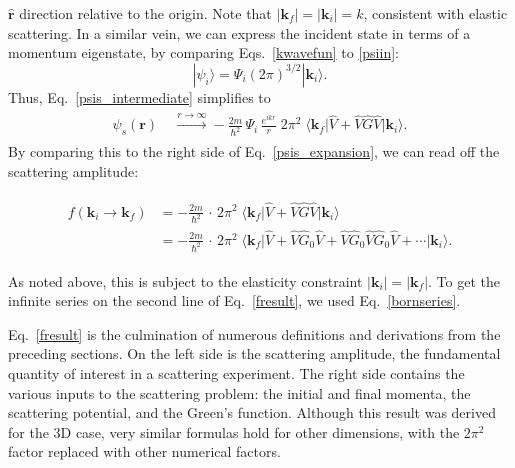 \documentclass[pra,12pt]{revtex4-2}
\begin{document}
$\hat{\mathbf{r}}$ direction relative to the origin.  Note that
$|\mathbf{k}_f| = |\mathbf{k}_i| = k$, consistent with elastic
scattering.  In a similar vein, we can express the incident state in
terms of a momentum eigenstate, by comparing Eqs.~\eqref{kwavefun} to
\eqref{psiin}:
\begin{equation}
  |\psi_i\rangle = \Psi_i (2\pi)^{3/2} |\mathbf{k}_i\rangle.  
\end{equation}
Thus, Eq.~\eqref{psis_intermediate} simplifies to
\begin{align}
  \begin{aligned}\psi_s(\mathbf{r}) \; &\overset{r\rightarrow\infty}{\longrightarrow} - \frac{2m}{\hbar^2} \, \Psi_i\, \frac{e^{ikr}}{r} \; 2\pi^2 \; \big\langle \mathbf{k}_f \big|\hat{V} + \hat{V}\hat{G}\hat{V}\big|\mathbf{k}_i\big\rangle.\end{aligned}
\end{align}
By comparing this to the right side of Eq.~\eqref{psis_expansion}, we
can read off the scattering amplitude:
\begin{framed}
  \begin{align}
    \begin{aligned}
      f(\mathbf{k}_i \rightarrow \mathbf{k}_f) &= - \frac{2m}{\hbar^2} \,\cdot \, 2\pi^2 \; \big\langle \mathbf{k}_f\big| \hat{V} + \hat{V}\hat{G} \hat{V} \big|\mathbf{k}_i\big\rangle \\
      &= - \frac{2m}{\hbar^2} \,\cdot \, 2\pi^2 \; \big\langle \mathbf{k}_f\big| \hat{V} + \hat{V}\hat{G}_0 \hat{V} + \hat{V} \hat{G}_0 \hat{V} \hat{G}_0\hat{V} + \cdots \big|\mathbf{k}_i\big\rangle.  \end{aligned}
    \label{fresult}
  \end{align}
\end{framed}
\vskip -0.15in
\noindent
As noted above, this is subject to the elasticity constraint
$|\mathbf{k}_i| = |\mathbf{k}_f|$.  To get the infinite series on the
second line of Eq.~\eqref{fresult}, we used Eq.~\eqref{bornseries}.

Eq.~\eqref{fresult} is the culmination of numerous definitions and
derivations from the preceding sections.  On the left side is the
scattering amplitude, the fundamental quantity of interest in a
scattering experiment.  The right side contains the various inputs to
the scattering problem: the initial and final momenta, the scattering
potential, and the Green's function.  Although this result was derived
for the 3D case, very similar formulas hold for other dimensions, with
the $2\pi^2$ factor replaced with other numerical factors.
\end{document}
